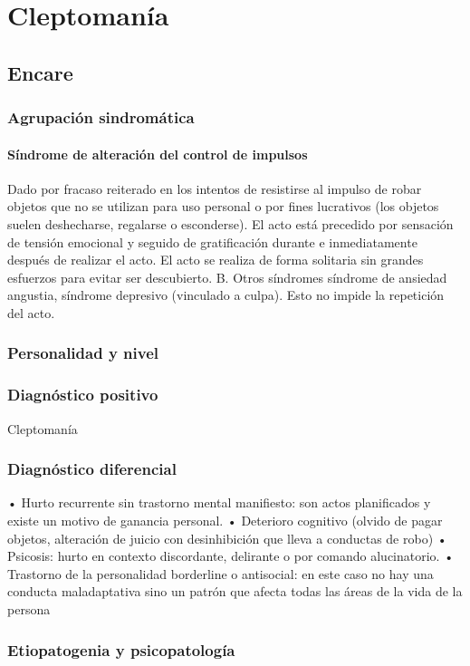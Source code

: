 \chapter{Cleptomanía}
\section*{Encare}
\subsection*{Agrupación sindromática}
\subsubsection{Síndrome de alteración del control de impulsos}
Dado por fracaso reiterado en los intentos de resistirse al impulso de robar objetos que no se utilizan para uso personal o por fines lucrativos (los objetos suelen deshecharse, regalarse o esconderse). El acto está precedido por sensación de tensión emocional y seguido de gratificación durante e inmediatamente después de realizar el acto. El acto se realiza de forma solitaria sin grandes esfuerzos para evitar ser descubierto. B. Otros síndromes síndrome de ansiedad angustia, síndrome depresivo (vinculado a culpa). Esto no impide la repetición del acto.
\subsection*{Personalidad y nivel}
\subsection*{Diagnóstico positivo}
Cleptomanía
\subsection*{Diagnóstico diferencial}

• Hurto recurrente sin trastorno mental manifiesto: son actos planificados y existe un motivo de ganancia personal.
• Deterioro cognitivo (olvido de pagar objetos, alteración de juicio con desinhibición que lleva a conductas de robo)
• Psicosis: hurto en contexto discordante, delirante o por comando alucinatorio.
• Trastorno de la personalidad borderline o antisocial: en este caso no hay una conducta maladaptativa sino un patrón que afecta todas las áreas de la vida de la persona
\subsection*{Etiopatogenia y psicopatología}
